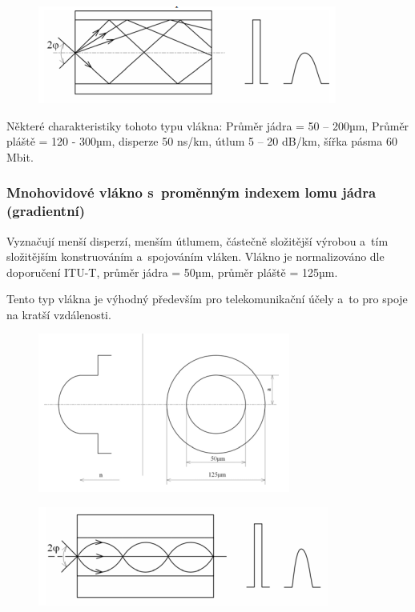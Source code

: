 \begin{figure}[!ht]
  \begin{center}
    \includegraphics[scale=1]{obrazky/sirmnoh1.png}
  \end{center}
\end{figure}

Některé charakteristiky tohoto typu vlákna: Průměr jádra = 50 – 200µm, Průměr pláště = 120 - 300µm, disperze 50 ns/km, útlum 5 – 20 dB/km, šířka pásma 60 Mbit.

\subsubsection{Mnohovidové vlákno s~proměnným indexem lomu jádra (gradientní)}
Vyznačují menší disperzí, menším útlumem, částečně složitější výrobou a~tím složitějším konstruováním a~spojováním vláken. Vlákno je normalizováno dle doporučení ITU-T, průměr jádra = 50µm, průměr pláště = 125µm.

Tento typ vlákna je výhodný především pro telekomunikační účely a~to pro spoje na kratší vzdálenosti.

\begin{figure}[!ht]
  \begin{center}
    \includegraphics[scale=1]{obrazky/mnohavid2.png}
  \end{center}
\end{figure}

\begin{figure}[!ht]
  \begin{center}
    \includegraphics[scale=1]{obrazky/sirmnoh2.png}
  \end{center}
\end{figure}

